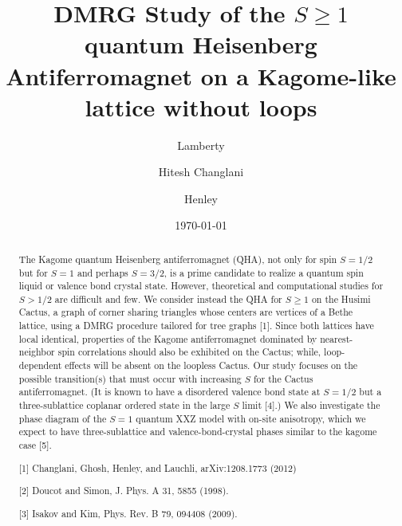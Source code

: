 \documentclass[aps, superscriptaddress]{revtex4-1}
\begin{document}
\title{DMRG Study of the $S\ge 1$ quantum Heisenberg Antiferromagnet on a Kagome-like lattice without loops}
\date{\today}

\author{ Lamberty}
\author{Hitesh Changlani}
\author{ Henley}

\begin{abstract}
The Kagome quantum Heisenberg antiferromagnet (QHA), not only for spin $S=1/2$ but for $S=1$ and perhaps $S=3/2$, is a prime candidate to realize a quantum spin liquid or valence bond crystal state. However, theoretical and computational studies for $S>1/2$ are difficult and few. We consider instead the QHA for $S\ge1$ on the Husimi Cactus, a graph of corner sharing triangles whose centers are vertices of a Bethe lattice, using a DMRG procedure tailored for tree graphs [1]. Since both lattices have local identical, properties of the Kagome antiferromagnet dominated by nearest-neighbor spin correlations should also be exhibited on the Cactus; while, loop-dependent effects will be absent on the loopless Cactus. Our study focuses on the possible transition(s) that must occur with increasing $S$ for the Cactus antiferromagnet.  (It is known to have a disordered valence bond state at $S=1/2$ but a three-sublattice coplanar ordered state in the large $S$ limit [4].) We also investigate the phase diagram of the $S=1$ quantum XXZ model with on-site anisotropy, which we expect to have three-sublattice and valence-bond-crystal phases similar to the kagome case [5].

[1] Changlani, Ghosh, Henley, and Lauchli, arXiv:1208.1773 (2012)

[2] Doucot and Simon, J. Phys. A 31, 5855 (1998).

[3] Isakov and Kim, Phys. Rev. B 79, 094408 (2009).
\end{abstract}
\maketitle
\end{document}
